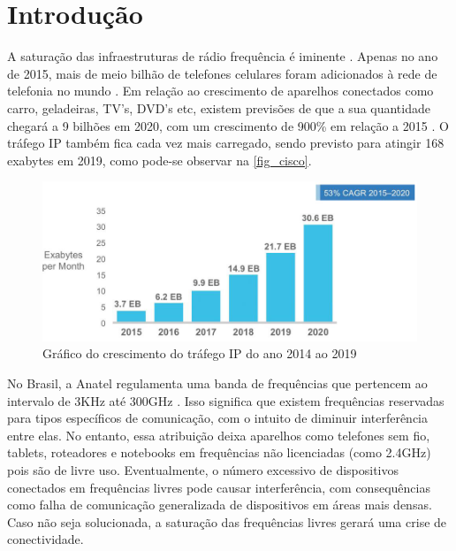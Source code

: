 	\chapter*[Introdução]{Introdução} %
		
	A saturação das infraestruturas de rádio frequência é iminente \cite{load-balancing}. Apenas no ano de 2015, mais de meio bilhão de telefones celulares foram adicionados à rede de telefonia no mundo \cite{cisco-forecast}. Em relação ao crescimento de aparelhos conectados como carro, geladeiras, TV’s, DVD’s etc, existem previsões de que a sua quantidade chegará a 9 bilhões em 2020, com um crescimento 	de 900\% em relação a 2015 \cite{erricson-report}. O tráfego IP também fica cada vez mais carregado, sendo previsto para atingir 168 exabytes em 2019, como pode-se observar na \autoref{fig_cisco}.
	
	\begin{figure}[!htb]
		\caption{\label{fig_cisco}Gráfico do crescimento do tráfego IP do ano 2014 ao 2019}
		\begin{center}
			\includegraphics[scale=0.5]{cisco_exabytes_per_month.png}
		\end{center}
	\end{figure}
	
	No Brasil, a Anatel regulamenta uma banda de frequências que pertencem ao intervalo  de 3KHz até 300GHz \cite{faixa-anatel}. Isso significa que existem frequências reservadas para tipos específicos de comunicação, com o intuito de diminuir interferência entre elas. No entanto, essa atribuição deixa aparelhos como telefones sem fio, tablets, roteadores e notebooks em frequências não licenciadas (como 2.4GHz) pois são de livre uso. Eventualmente, o número excessivo de dispositivos conectados em  frequências livres pode causar interferência, com consequências como falha de comunicação generalizada de dispositivos em áreas mais densas. Caso não seja solucionada, a saturação das frequências livres gerará uma crise de conectividade. \par 
	
